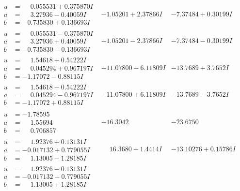 \documentclass[1p]{elsarticle_modified}
\theoremstyle{definition}
\begin{document}
$$\begin{array}{c|c|c}
\begin{aligned}
u &= \phantom{-}0.055531 + 0.375870 I \\
a &= \phantom{-}3.27936 - 0.40059 I \\
b &= -0.735830 + 0.136693 I\end{aligned}
 & -1.05201 + 2.37866 I & -7.37484 + 0.30199 I \\ \hline\begin{aligned}
u &= \phantom{-}0.055531 - 0.375870 I \\
a &= \phantom{-}3.27936 + 0.40059 I \\
b &= -0.735830 - 0.136693 I\end{aligned}
 & -1.05201 - 2.37866 I & -7.37484 - 0.30199 I \\ \hline\begin{aligned}
u &= \phantom{-}1.54618 + 0.54222 I \\
a &= \phantom{-}0.045294 + 0.967197 I \\
b &= -1.17072 - 0.88115 I\end{aligned}
 & -11.07800 - 6.11809 I & -13.7689 + 3.7652 I \\ \hline\begin{aligned}
u &= \phantom{-}1.54618 - 0.54222 I \\
a &= \phantom{-}0.045294 - 0.967197 I \\
b &= -1.17072 + 0.88115 I\end{aligned}
 & -11.07800 + 6.11809 I & -13.7689 - 3.7652 I \\ \hline\begin{aligned}
u &= -1.78595\phantom{ +0.000000I} \\
a &= \phantom{-}1.55694\phantom{ +0.000000I} \\
b &= \phantom{-}0.706857\phantom{ +0.000000I}\end{aligned}
 & -16.3042\phantom{ +0.000000I} & -23.6750\phantom{ +0.000000I} \\ \hline\begin{aligned}
u &= \phantom{-}1.92376 + 0.13131 I \\
a &= -0.017132 + 0.779055 I \\
b &= \phantom{-}1.13005 - 1.28185 I\end{aligned}
 & \phantom{-}16.3680 - 1.4414 I & -13.10276 + 0.15786 I \\ \hline\begin{aligned}
u &= \phantom{-}1.92376 - 0.13131 I \\
a &= -0.017132 - 0.779055 I \\
b &= \phantom{-}1.13005 + 1.28185 I\end{aligned}

\end{array}$$
\end{document}
